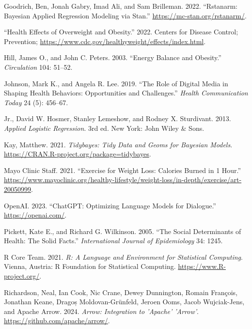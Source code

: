 \documentclass[
  letterpaper,
  DIV=11,
  numbers=noendperiod]{scrartcl}
\newlength{\cslhangindent}
\newlength{\cslentryspacingunit} %
\newenvironment{CSLReferences}[2] %
 {%
  \setlength{\parindent}{0pt}
  \ifodd #1
  \let\oldpar\par
  \def\par{\hangindent=\cslhangindent\oldpar}
  \fi
  \setlength{\parskip}{#2\cslentryspacingunit}
 }%
 {}
\begin{document}
\begin{CSLReferences}{1}{0}
\leavevmode{}%
Goodrich, Ben, Jonah Gabry, Imad Ali, and Sam Brilleman. 2022.
{``Rstanarm: {Bayesian} Applied Regression Modeling via {Stan}.''}
\url{https://mc-stan.org/rstanarm/}.

\leavevmode{}%
{``Health Effects of Overweight and Obesity.''} 2022. Centers for
Disease Control; Prevention;
\url{https://www.cdc.gov/healthyweight/effects/index.html}.

\leavevmode{}%
Hill, James O., and John C. Peters. 2003. {``Energy Balance and
Obesity.''} \emph{Circulation} 104: 51--52.

\leavevmode{}%
Johnson, Mark K., and Angela R. Lee. 2019. {``The Role of Digital Media
in Shaping Health Behaviors: Opportunities and Challenges.''}
\emph{Health Communication Today} 24 (5): 456--67.

\leavevmode{}%
Jr., David W. Hosmer, Stanley Lemeshow, and Rodney X. Sturdivant. 2013.
\emph{Applied Logistic Regression}. 3rd ed. New York: John Wiley \&
Sons.

\leavevmode{}%
Kay, Matthew. 2021. \emph{Tidybayes: Tidy Data and Geoms for Bayesian
Models}. \url{https://CRAN.R-project.org/package=tidybayes}.

\leavevmode{}%
Mayo Clinic Staff. 2021. {``Exercise for Weight Loss: Calories Burned in
1 Hour.''}
\url{https://www.mayoclinic.org/healthy-lifestyle/weight-loss/in-depth/exercise/art-20050999}.

\leavevmode{}%
OpenAI. 2023. {``ChatGPT: Optimizing Language Models for Dialogue.''}
\url{https://openai.com/}.

\leavevmode{}%
Pickett, Kate E., and Richard G. Wilkinson. 2005. {``The Social
Determinants of Health: The Solid Facts.''} \emph{International Journal
of Epidemiology} 34: 1245.

\leavevmode{}%
R Core Team. 2021. \emph{R: A Language and Environment for Statistical
Computing}. Vienna, Austria: R Foundation for Statistical Computing.
\url{https://www.R-project.org/}.

\leavevmode{}%
Richardson, Neal, Ian Cook, Nic Crane, Dewey Dunnington, Romain
François, Jonathan Keane, Dragoș Moldovan-Grünfeld, Jeroen Ooms, Jacob
Wujciak-Jens, and Apache Arrow. 2024. \emph{Arrow: Integration to
'Apache' 'Arrow'}. \url{https://github.com/apache/arrow/}.


\end{CSLReferences}
\end{document}
